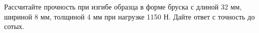 
Рассчитайте прочность при изгибе образца в форме бруска с длиной 32 мм, шириной 8 мм, толщиной 4 мм при нагрузке 1150 Н. Дайте ответ с точность до сотых.